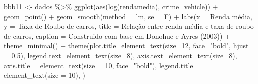 \documentclass[
]{article}
\newenvironment{Shaded}{\begin{snugshade}}{\end{snugshade}}
\newcommand{\AttributeTok}[1]{\textcolor[rgb]{0.77,0.63,0.00}{#1}}
\newcommand{\DecValTok}[1]{\textcolor[rgb]{0.00,0.00,0.81}{#1}}
\newcommand{\FloatTok}[1]{\textcolor[rgb]{0.00,0.00,0.81}{#1}}
\newcommand{\FunctionTok}[1]{\textcolor[rgb]{0.00,0.00,0.00}{#1}}
\newcommand{\NormalTok}[1]{#1}
\newcommand{\OtherTok}[1]{\textcolor[rgb]{0.56,0.35,0.01}{#1}}
\newcommand{\SpecialCharTok}[1]{\textcolor[rgb]{0.00,0.00,0.00}{#1}}
\newcommand{\StringTok}[1]{\textcolor[rgb]{0.31,0.60,0.02}{#1}}
\begin{document}
\begin{Shaded}
\begin{Highlighting}[]
\NormalTok{bbb11 }\OtherTok{\textless{}{-}}\NormalTok{ dados }\SpecialCharTok{\%\textgreater{}\%} 
  \FunctionTok{ggplot}\NormalTok{(}\FunctionTok{aes}\NormalTok{(}\FunctionTok{log}\NormalTok{(rendamedia), crime\_vehicle)) }\SpecialCharTok{+}
  \FunctionTok{geom\_point}\NormalTok{() }\SpecialCharTok{+} 
  \FunctionTok{geom\_smooth}\NormalTok{(}\AttributeTok{method =} \StringTok{\textquotesingle{}lm\textquotesingle{}}\NormalTok{, }\AttributeTok{se =}\NormalTok{ F) }\SpecialCharTok{+}
  \FunctionTok{labs}\NormalTok{(}\AttributeTok{x =} \StringTok{\textquotesingle{}Renda média\textquotesingle{}}\NormalTok{,}
       \AttributeTok{y =} \StringTok{\textquotesingle{}Taxa de Roubo de carros\textquotesingle{}}\NormalTok{,}
       \AttributeTok{title =} \StringTok{\textquotesingle{}Relação entre renda média e taxa de roubo de carros\textquotesingle{}}\NormalTok{,}
       \AttributeTok{caption =} \StringTok{\textquotesingle{}Construido com base em Donohue e Ayres (2003)\textquotesingle{}}\NormalTok{) }\SpecialCharTok{+} 
  \FunctionTok{theme\_minimal}\NormalTok{() }\SpecialCharTok{+}
  \FunctionTok{theme}\NormalTok{(}\AttributeTok{plot.title=}\FunctionTok{element\_text}\NormalTok{(}\AttributeTok{size=}\DecValTok{12}\NormalTok{, }\AttributeTok{face=}\StringTok{"bold"}\NormalTok{, }\AttributeTok{hjust =} \FloatTok{0.5}\NormalTok{),}
        \AttributeTok{legend.text=}\FunctionTok{element\_text}\NormalTok{(}\AttributeTok{size=}\DecValTok{8}\NormalTok{),}
        \AttributeTok{axis.text=}\FunctionTok{element\_text}\NormalTok{(}\AttributeTok{size=}\DecValTok{8}\NormalTok{),}
        \AttributeTok{axis.title =} \FunctionTok{element\_text}\NormalTok{(}\AttributeTok{size =} \DecValTok{10}\NormalTok{, }\AttributeTok{face=}\StringTok{"bold"}\NormalTok{),}
        \AttributeTok{legend.title =} \FunctionTok{element\_text}\NormalTok{(}\AttributeTok{size =} \DecValTok{10}\NormalTok{),}
\NormalTok{        )}



\end{Highlighting}
\end{Shaded}
\end{document}
